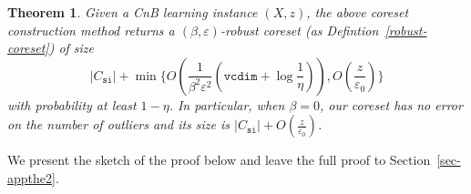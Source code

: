 \documentclass{article}
\newtheorem{theorem}{Theorem}
\begin{document}


\begin{theorem}
	\label{thm-coreset-outlier}
	Given a CnB learning instance $(X,z)$, the above coreset construction method returns a $ (\beta, \varepsilon) $-robust coreset (as Defintion~\ref{robust-coreset}) of size 
	\begin{equation}
	 |C_{\mathtt{si}}|+\min \Big\{ O\left( \frac{1}{\beta^2\varepsilon^2}(\mathtt{vcdim}+\log\frac{1}{\eta}) \right),O\left(\frac{z}{\varepsilon_0}\right) \Big\}  
	 \end{equation}
	with probability at least $ 1-\eta $. In particular, when $ \beta=0 $, our coreset has no error on the number of outliers and its size is $ |C_{\mathtt{si}}|+ O\left( \frac{z}{\varepsilon_0} \right) $.
\end{theorem}
We present the sketch of the proof below and leave the full proof to Section~\ref{sec-appthe2}. 
\end{document}
